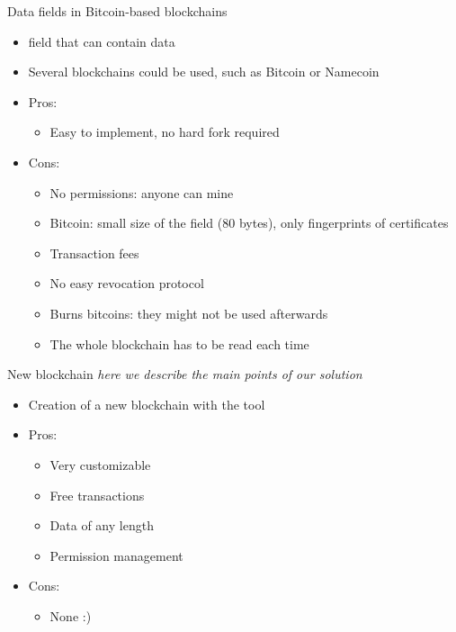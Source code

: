 \begin{frame}{Data fields in Bitcoin-based blockchains}

\begin{itemize}
\item {} field that can contain data
\item Several blockchains could be used, such as Bitcoin or Namecoin
\item Pros:
\begin{itemize}
\item Easy to implement, no hard fork required
\end{itemize}
\item Cons:
\begin{itemize}
\item No permissions: anyone can mine
\item Bitcoin: small size of the field (80 bytes), only fingerprints of certificates
\item Transaction fees
\item No easy revocation protocol
\item Burns bitcoins: they might not be used afterwards
\item The whole blockchain has to be read each time
\end{itemize}

\end{itemize}

\end{frame}





\begin{frame}{New blockchain}
\emph{here we describe the main points of our solution}

\begin{itemize}
\item Creation of a new blockchain with the  tool
\item Pros:
\begin{itemize}
\item Very customizable
\item Free transactions
\item Data of any length
\item Permission management
\end{itemize}
\item Cons:
\begin{itemize}
\item None :)
\end{itemize}


\end{itemize}
\end{frame}


